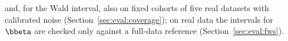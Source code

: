 and, for the Wald interval, also on fixed cohorts of five real datasets with calibrated noise (Section~\ref{sec:eval:coverage}); on real data the intervals for $\bbeta$ are checked only against a full-data reference (Section~\ref{sec:eval:fws}).
